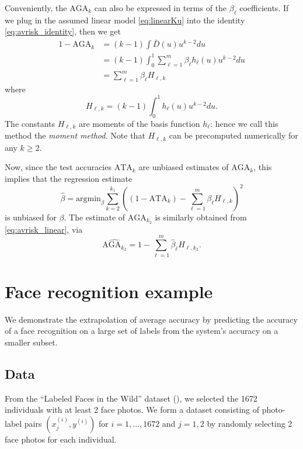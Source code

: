 \documentclass[twoside,11pt]{article}
\newcommand{\argmin}{\text{argmin}}
\begin{document}
Conveniently, the $\text{AGA}_k$ can also be expressed in terms of the $\beta_\ell$ coefficients.
If we plug in the assumed linear model \eqref{eq:linearKu} into the
identity \eqref{eq:avrisk_identity}, then we get
\begin{align}
1 - \text{AGA}_k &= (k-1)\int \bar{D}(u) u^{k-2} du
\\&= (k-1)\int_0^1 \sum_{\ell = 1}^m \beta_\ell h_\ell(u) u^{k-2} du
\\&= \sum_{\ell = 1}^m \beta_\ell H_{\ell,k} \label{eq:avrisk_linear}
\end{align}
where
\begin{equation}
H_{\ell,k} = (k-1) \int_0^1 h_\ell(u) u^{k-2} du.
\end{equation}
The constants $H_{\ell, k}$ are moments of the basis function
$h_\ell$: hence we call this method the \emph{moment method.}  Note
that $H_{\ell, k}$ can be precomputed numerically for any $k \geq 2$.

Now, since the test accuracies $\text{ATA}_k$ are unbiased estimates of
$\text{AGA}_{k}$, this implies that the regression
estimate
\[
\hat{\beta} = \argmin_\beta \sum_{k=2}^{k_1} \left( (1 - \text{ATA}_k) - \sum_{\ell=1}^m \beta_\ell H_{\ell, k}\right)^2
\]
is unbiased for $\beta$. The estimate of $\text{AGA}_{k_2}$ is similarly obtained
from \eqref{eq:avrisk_linear}, via
\begin{equation}\label{eq:avrisk_hat}
\widehat{\text{AGA}_{k_2}} = 1 - \sum_{\ell=1}^m \hat{\beta}_\ell H_{\ell, k_2}.
\end{equation}

\section{Face recognition example}\label{sec:extrapolation_example}

We demonstrate the extrapolation of average accuracy by predicting  the accuracy of a face recognition on a large set of labels from the system's accuracy on a smaller subset. 

\subsection{Data}
From the ``Labeled Faces in the Wild'' dataset (\cite{LFWTech}), we
selected the 1672 individuals with at least 2 face photos.  We form a
dataset consisting of photo-label pairs $(x_j^{(i)}, y^{(i)})$
for $i = 1,\hdots, 1672$ and $j = 1,2$ by randomly selecting 2 face
photos for each individual. 
\end{document}
